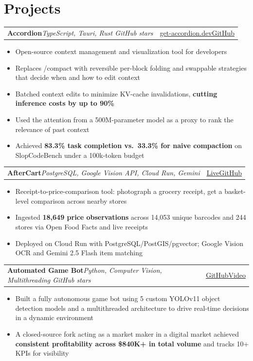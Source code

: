 \documentclass[letterpaper,11pt]{article}
\makeatletter
\newenvironment{bullets}{\small\begin{itemize}}{\end{itemize}\vspace{1pt}}
\newcommand{\sep}{\enspace\textbar\enspace}
\newcommand{\link}[2]{\href{#1}{\underline{#2}}}
\newcommand{\project}[3]{%
  \begin{tabular*}{\linewidth}{@{}l@{\extracolsep{\fill}}r@{}}
    \textbf{#1}\sep\textit{\small #2} & {\small #3} \\
  \end{tabular*}\par}
\makeatother
\begin{document}
\section{Projects}
\project{Accordion}{TypeScript, Tauri, Rust\textup{\sep 243 GitHub stars}}{\link{https://get-accordion.dev/}{get-accordion.dev}\sep\link{https://github.com/a-Fig/Accordion}{GitHub}}
\begin{bullets}
  \item Open-source context management and visualization tool for developers
  \item Replaces /compact with reversible per-block folding and swappable strategies that decide when and how to edit context
  \item Batched context edits to minimize KV-cache invalidations, \textbf{cutting inference costs by up to 90\%}
  \item Used the attention from a 500M-parameter model as a proxy to rank the relevance of past context
  \item Achieved \textbf{83.3\% task completion vs.\ 33.3\% for naive compaction} on SlopCodeBench under a 100k-token budget
\end{bullets}

\project{AfterCart}{PostgreSQL, Google Vision API, Cloud Run, Gemini}{\link{https://aftercart-web-407493014719.us-west1.run.app/}{Live}\sep\link{https://github.com/a-Fig/aftercart-davis-hacks-2026}{GitHub}}
\begin{bullets}
  \item Receipt-to-price-comparison tool: photograph a grocery receipt, get a basket-level comparison across nearby stores
  \item Ingested \textbf{18,649 price observations} across 14,053 unique barcodes and 244 stores via Open Food Facts and live receipts
  \item Deployed on Cloud Run with PostgreSQL/PostGIS/pgvector; Google Vision OCR and Gemini 2.5 Flash item matching
\end{bullets}

\project{Automated Game Bot}{Python, Computer Vision, Multithreading\textup{\sep 25 GitHub stars}}{\link{https://github.com/a-Fig/Automated-Game-Bot}{GitHub}\sep\link{https://youtu.be/l8Mt02X6kl4}{Video}}
\begin{bullets}
  \item Built a fully autonomous game bot using 5 custom YOLOv11 object detection models and a multithreaded architecture to drive real-time decisions in a dynamic environment
  \item A closed-source fork acting as a market maker in a digital market achieved \textbf{consistent profitability across \$840K+ in total volume} and tracks 10+ KPIs for visibility
\end{bullets}
\end{document}
